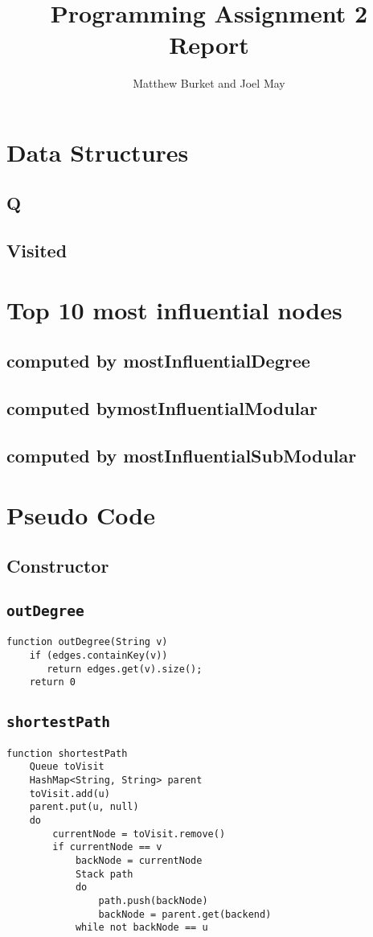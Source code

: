 \documentclass[10pt,letterpaper]{article}
\author{Matthew Burket and Joel May}
\title{Programming Assignment 2 Report}
\begin{document}
\maketitle
\section{Data Structures}
\subsection{Q}
\subsection{Visited}
\section{Top 10 most influential nodes}
\subsection{computed by mostInfluentialDegree}
\subsection{computed bymostInfluentialModular}
\subsection{computed by mostInfluentialSubModular}
\section{Pseudo Code}
\subsection{Constructor}
\subsection{\texttt{outDegree}}
\begin{verbatim}
function outDegree(String v)
    if (edges.containKey(v))
       return edges.get(v).size();
	return 0
\end{verbatim}
\subsection{\texttt{shortestPath}}
\begin{verbatim}
function shortestPath
   	Queue toVisit
   	HashMap<String, String> parent
   	toVisit.add(u)
   	parent.put(u, null)
   	do
   		currentNode = toVisit.remove()
   		if currentNode == v
   			backNode = currentNode
   			Stack path
   			do 
   				path.push(backNode)
   				backNode = parent.get(backend)
   			while not backNode == u
   			
\end{verbatim}
\end{document}
